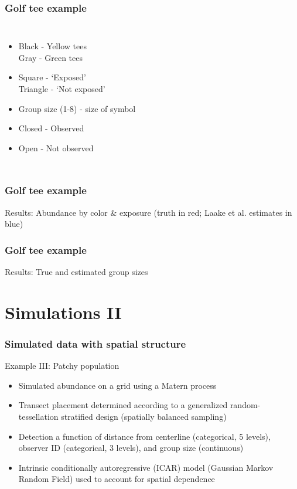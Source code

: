 \documentclass[serif,mathserif]{beamer}
\begin{document}
\begin{frame}
  \frametitle{Golf tee example}
  \begin{columns}[c]
  \column{1.8in}
    \begin{itemize}
      \item Black - Yellow tees \\
            Gray - Green tees
      \item Square - `Exposed' \\
            Triangle - `Not exposed' \\
      \item Group size (1-8) - size of symbol \\
      \item Closed - Observed \\
      \item Open - Not observed\\
    \end{itemize}
  \column{2.5in}
  \end{columns}
\end{frame}

\begin{frame}
  \frametitle{Golf tee example}
  Results: Abundance by color \& exposure (truth in red; Laake et al. estimates in blue)

\end{frame}

\begin{frame}
  \frametitle{Golf tee example}
  Results: True and estimated group sizes
\end{frame}

\section{Simulations II}
\begin{frame}
  \frametitle{Simulated data with spatial structure}
  Example III: Patchy population
  \begin{itemize}
  \item Simulated abundance on a grid using a Matern process
  \item Transect placement determined according to a generalized random-tessellation stratified design (spatially balanced sampling)
  \item Detection a function of distance from centerline (categorical, 5 levels), observer ID (categorical, 3 levels), and group size (continuous)
  \item Intrinsic conditionally autoregressive (ICAR) model (Gaussian Markov Random Field)
      used to account for spatial dependence
  \end{itemize}
\end{frame}
\end{document}
